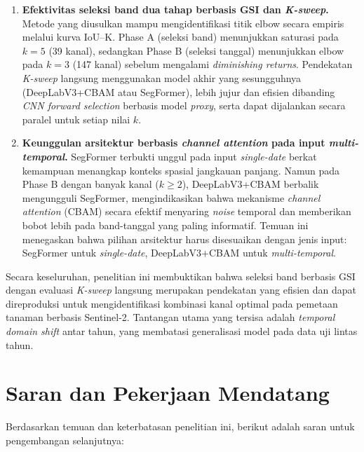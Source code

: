 \begin{enumerate}
    \item \textbf{Efektivitas seleksi band dua tahap berbasis GSI dan \textit{K-sweep}.}
    Metode yang diusulkan mampu mengidentifikasi titik elbow secara empiris melalui kurva IoU--K. Phase A (seleksi band) menunjukkan saturasi pada $k=5$ (39 kanal), sedangkan Phase B (seleksi tanggal) menunjukkan elbow pada $k=3$ (147 kanal) sebelum mengalami \textit{diminishing returns}. Pendekatan \textit{K-sweep} langsung menggunakan model akhir yang sesungguhnya (DeepLabV3+CBAM atau SegFormer), lebih jujur dan efisien dibanding \textit{CNN forward selection} berbasis model \textit{proxy}, serta dapat dijalankan secara paralel untuk setiap nilai $k$.

    \item \textbf{Keunggulan arsitektur berbasis \textit{channel attention} pada input \textit{multi-temporal}.}
    SegFormer terbukti unggul pada input \textit{single-date} berkat kemampuan menangkap konteks spasial jangkauan panjang. Namun pada Phase B dengan banyak kanal ($k \geq 2$), DeepLabV3+CBAM berbalik mengungguli SegFormer, mengindikasikan bahwa mekanisme \textit{channel attention} (CBAM) secara efektif menyaring \textit{noise} temporal dan memberikan bobot lebih pada band-tanggal yang paling informatif. Temuan ini menegaskan bahwa pilihan arsitektur harus disesuaikan dengan jenis input: SegFormer untuk \textit{single-date}, DeepLabV3+CBAM untuk \textit{multi-temporal}.

\end{enumerate}

Secara keseluruhan, penelitian ini membuktikan bahwa seleksi band berbasis GSI dengan evaluasi \textit{K-sweep} langsung merupakan pendekatan yang efisien dan dapat direproduksi untuk mengidentifikasi kombinasi kanal optimal pada pemetaan tanaman berbasis Sentinel-2. Tantangan utama yang tersisa adalah \textit{temporal domain shift} antar tahun, yang membatasi generalisasi model pada data uji lintas tahun.

\section{Saran dan Pekerjaan Mendatang}

Berdasarkan temuan dan keterbatasan penelitian ini, berikut adalah saran untuk pengembangan selanjutnya:

